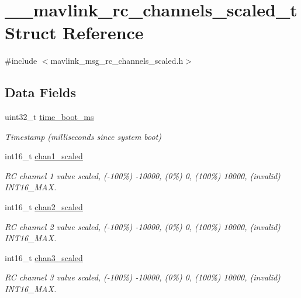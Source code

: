 \hypertarget{struct____mavlink__rc__channels__scaled__t}{\section{\+\_\+\+\_\+mavlink\+\_\+rc\+\_\+channels\+\_\+scaled\+\_\+t Struct Reference}
\label{struct____mavlink__rc__channels__scaled__t}
}


{\ttfamily \#include $<$mavlink\+\_\+msg\+\_\+rc\+\_\+channels\+\_\+scaled.\+h$>$}

\subsection*{Data Fields}
\begin{DoxyCompactItemize}
\item 
uint32\+\_\+t \hyperlink{struct____mavlink__rc__channels__scaled__t_ae035a89efbc6107932416a1a65268bfe}{time\+\_\+boot\+\_\+ms}
\begin{DoxyCompactList}\small\item\em Timestamp (milliseconds since system boot) \end{DoxyCompactList}\item 
int16\+\_\+t \hyperlink{struct____mavlink__rc__channels__scaled__t_a2d350897e12b0008208e61a031f01270}{chan1\+\_\+scaled}
\begin{DoxyCompactList}\small\item\em R\+C channel 1 value scaled, (-\/100\%) -\/10000, (0\%) 0, (100\%) 10000, (invalid) I\+N\+T16\+\_\+\+M\+A\+X. \end{DoxyCompactList}\item 
int16\+\_\+t \hyperlink{struct____mavlink__rc__channels__scaled__t_a8ca88934095102f7195b4e5ab88ecd5c}{chan2\+\_\+scaled}
\begin{DoxyCompactList}\small\item\em R\+C channel 2 value scaled, (-\/100\%) -\/10000, (0\%) 0, (100\%) 10000, (invalid) I\+N\+T16\+\_\+\+M\+A\+X. \end{DoxyCompactList}\item 
int16\+\_\+t \hyperlink{struct____mavlink__rc__channels__scaled__t_a1f6f236dabbe2174233f2bf4e16f3c7d}{chan3\+\_\+scaled}
\begin{DoxyCompactList}\small\item\em R\+C channel 3 value scaled, (-\/100\%) -\/10000, (0\%) 0, (100\%) 10000, (invalid) I\+N\+T16\+\_\+\+M\+A\+X. \end{DoxyCompactList}\item 

\end{DoxyCompactItemize}

